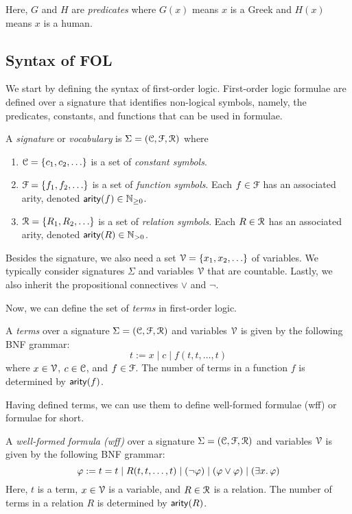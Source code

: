 \documentclass[11pt,usenames, dvipsnames]{article}
\begin{document}
Here, $G$ and $H$ are \emph{predicates} where $G(x)$ means $x$ is a Greek and $H(x)$ means $x$ is a human. 

\subsection*{\large \centering Syntax of FOL}
\noindent

We start by defining the syntax of first-order logic. First-order logic formulae are defined over a signature that identifies non-logical symbols, namely, the predicates, constants, and functions that can be used in formulae.

\begin{definition}[Signature]
  A \emph{signature} or \emph{vocabulary} is $\Sigma = (\conn, \func, \reln)$ where
  \begin{enumerate}
    \item $\conn = \{c_1, c_2, \ldots \}$ is a set of \emph{constant symbols}.
    \item $\func = \{f_1, f_2, \ldots\}$ is a set of \emph{function symbols}. Each $f \in \func$ has an associated arity, denoted $\mathsf{arity}(f) \in \mathbb{N}_{\ge 0}$.
    \item $\reln = \{R_1, R_2, \ldots\}$ is a set of \emph{relation symbols}. Each $R \in \reln$ has an associated arity, denoted $\mathsf{arity}(R) \in \mathbb{N}_{> 0}$.
  \end{enumerate}
\end{definition}

Besides the signature, we also need a set $\vars = \{x_1, x_2, \ldots\}$ of variables. We typically consider signatures $\Sigma$ and variables $\vars$ that are countable. Lastly, we also inherit the propositional connectives $\vee$ and $\neg$.

Now, we can define the set of \emph{terms} in first-order logic.

\begin{definition}[Terms]
  A \emph{terms} over a signature $\Sigma = (\conn, \func, \reln)$ and variables $\vars$ is given by the following BNF grammar:
  $$
  t := x \mid c \mid f(t, t, \ldots, t)
  $$
  where $x \in \vars$, $c \in \conn$, and $f \in \func$. The number of terms in a function $f$ is determined by $\mathsf{arity}(f)$.
\end{definition}

Having defined terms, we can use them to define well-formed formulae (wff) or formulae for short.

\begin{definition}[Formulae]
  A \emph{well-formed formula (wff)} over a signature $\Sigma = (\conn, \func, \reln)$ and variables $\vars$ is given by the following BNF grammar:
  $$
  \varphi := t = t \mid R(t, t, \ldots, t) \mid (\neg \varphi) \mid (\varphi \vee \varphi) \mid (\exists x \ldotp \varphi)
  $$
  Here, $t$ is a term, $x \in \vars$ is a variable, and $R \in \reln$ is a relation. The number of terms in a relation $R$ is determined by $\mathsf{arity}(R)$.
\end{definition}
\end{document}
